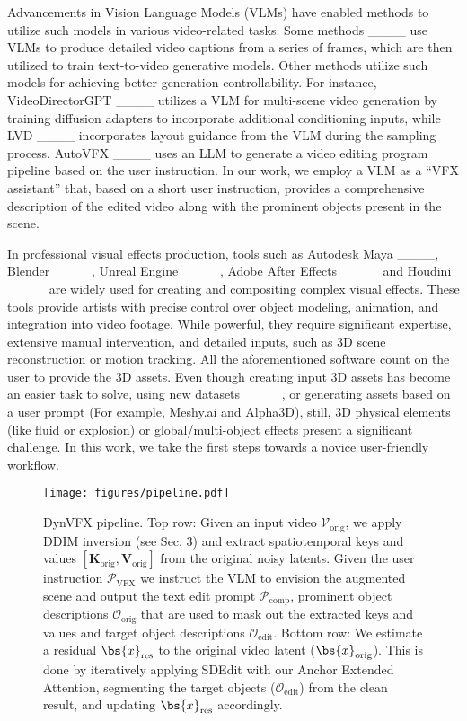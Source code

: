 Advancements in Vision Language Models (VLMs) have enabled 
methods to utilize such models in various video-related tasks. Some methods ____ use VLMs to produce detailed video captions from a series of frames, which are then utilized to train text-to-video generative models.
Other methods utilize such models for achieving better generation controllability. For instance, VideoDirectorGPT ____ utilizes a VLM for multi-scene video generation by training diffusion adapters to incorporate additional conditioning inputs, while LVD ____ incorporates layout guidance from the VLM during the sampling process. AutoVFX ____ uses an LLM to generate a video editing program pipeline based on the user instruction. In our work, we employ a VLM as a ``VFX assistant'' that, based on a short user instruction, provides a comprehensive description of the edited video along with the prominent objects present in the scene.

In professional visual effects production, tools such as Autodesk Maya ____, Blender ____, Unreal Engine ____, Adobe After Effects ____ and Houdini ____ are widely used for creating and compositing complex visual effects. These tools provide artists with precise control over object modeling, animation, and integration into video footage. While powerful, they require significant expertise, extensive manual intervention, and detailed inputs, such as 3D scene reconstruction or motion tracking. All the aforementioned software count on the user to provide the 3D assets. Even though creating input 3D assets has become an easier task to solve, using new datasets ____, or generating assets based on a user prompt (For example, Meshy.ai and Alpha3D), still, 3D physical elements (like fluid or explosion) or global/multi-object effects present a significant challenge. In this work, we take the first steps towards a novice user-friendly workflow. 

\begin{figure*}[ht!]
    \centering
    \texttt{[image: figures/pipeline.pdf]}
    \caption{DynVFX pipeline. Top row: Given an input video $\mathcal{V}_{\text{orig}}$, we apply DDIM inversion (see Sec. 3) and extract spatiotemporal keys and values $[\mathbf{K}_\text{orig}, \mathbf{V}_\text{orig}]$ from the original noisy latents. Given the user instruction $\mathcal{P}_{\text{VFX}}$ we instruct the VLM to envision the augmented scene and output the text edit prompt $\mathcal{P}_{\text{comp}}$, prominent object descriptions $\mathcal{O}_{\text{orig}}$ that are used to mask out the extracted keys and values and target object descriptions $\mathcal{O}_{\text{edit}}$. Bottom row: We estimate a residual $\bs{x}_{\text{res}}$ to the original video latent ($\bs{x}_{\text{orig}}$). This is done by iteratively applying SDEdit with our Anchor Extended Attention, segmenting the target objects ($\mathcal{O}_{\text{edit}}$) from the clean result, and updating $\bs{x}_{\text{res}}$ accordingly. 
     }
    \label{fig:pipeline}
\end{figure*}

